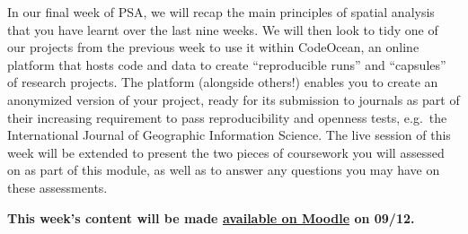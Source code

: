 \documentclass[
]{book}
\begin{document}
In our final week of PSA, we will recap the main principles of spatial analysis that you have learnt over the last nine weeks. We will then look to tidy one of our projects from the previous week to use it within CodeOcean, an online platform that hosts code and data to create ``reproducible runs'' and ``capsules'' of research projects. The platform (alongside others!) enables you to create an anonymized version of your project, ready for its submission to journals as part of their increasing requirement to pass reproducibility and openness tests, e.g.~the International Journal of Geographic Information Science. The live session of this week will be extended to present the two pieces of coursework you will assessed on as part of this module, as well as to answer any questions you may have on these assessments.

\textbf{This week's content will be made \href{https://moodle.ucl.ac.uk/}{available on Moodle} on 09/12.}
\end{document}
